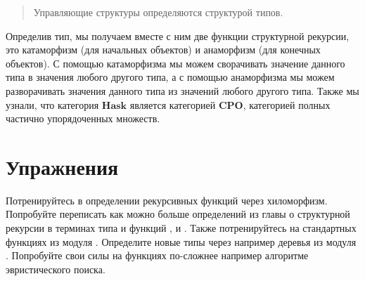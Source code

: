 \begin{quote}
Управляющие структуры определяются структурой типов.
\end{quote}

Определив тип, мы получаем вместе с ним две функции
структурной рекурсии, это катаморфизм (для начальных объектов) 
и анаморфизм (для конечных объектов). С помощью катаморфизма
мы можем сворачивать значение данного типа в значения
любого другого типа, а с помощью анаморфизма
мы можем разворачивать значения данного типа из
значений любого другого типа. Также мы узнали, что 
категория $\textbf{Hask}$
является категорией $\textbf{CPO}$, категорией полных
частично упорядоченных множеств.

\section{Упражнения}

Потренируйтесь в определении рекурсивных функций через хиломорфизм.
Попробуйте переписать как можно больше определений из главы
о структурной рекурсии в терминах типа  и функций 
,  и . Также потренируйтесь
на стандартных функциях из модуля . Определите
новые типы через  например деревья из модуля
. Попробуйте свои силы на функциях по-сложнее
например алгоритме эвристического поиска.

